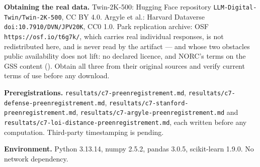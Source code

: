 \documentclass[sigconf,anonymous,review]{acmart}
\begin{document}
\begin{openscience}
\begin{sloppypar}
\textbf{Obtaining the real data.} Twin-2K-500: Hugging Face repository \texttt{LLM-\allowbreak{}Digital-\allowbreak{}Twin/\allowbreak{}Twin-\allowbreak{}2K-\allowbreak{}500}, CC BY 4.0. Argyle et al.: Harvard Dataverse \texttt{doi:10\allowbreak{}.7910/\allowbreak{}DVN/\allowbreak{}JPV20K}, CC0 1.0. Park replication archive: OSF \texttt{https:/\allowbreak{}/\allowbreak{}osf\allowbreak{}.io/\allowbreak{}t6g7k/\allowbreak{}}, which carries real individual responses, is not redistributed here, and is never read by the artifact --- and whose two obstacles public availability does not lift: no declared licence, and NORC's terms on the GSS content (\ethicsname{}). Obtain all three from their original sources and verify current terms of use before any download.

\textbf{Preregistrations.} \texttt{resultats/\allowbreak{}c7-\allowbreak{}preenregistrement\allowbreak{}.md}, \texttt{resultats/\allowbreak{}c7-\allowbreak{}defense-\allowbreak{}preenregistrement\allowbreak{}.md}, \texttt{resultats/\allowbreak{}c7-\allowbreak{}stanford-\allowbreak{}preenregistrement\allowbreak{}.md}, \texttt{resultats/\allowbreak{}c7-\allowbreak{}argyle-\allowbreak{}preenregistrement\allowbreak{}.md} and \texttt{resultats/\allowbreak{}c7-\allowbreak{}loi-\allowbreak{}distance-\allowbreak{}preenregistrement\allowbreak{}.md}, each written before any computation. Third-party timestamping is pending.

\textbf{Environment.} Python 3.13.14, numpy 2.5.2, pandas 3.0.5, scikit-learn 1.9.0. No network dependency.

\end{sloppypar}

\end{openscience}
\end{document}
